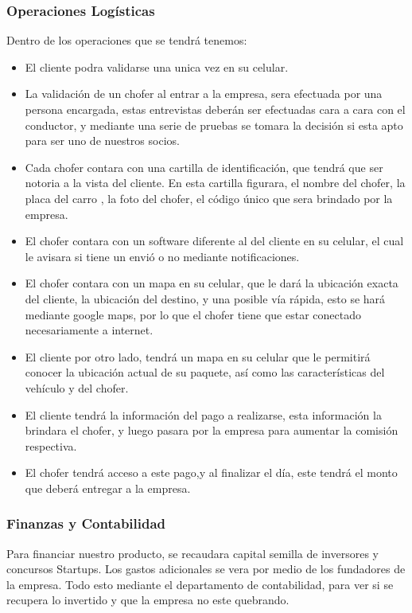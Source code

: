 \subsubsection{Operaciones Logísticas}
Dentro de los operaciones que se tendrá tenemos:
\begin{itemize}
    \item El cliente podra validarse una unica vez en su celular.
    \item La validación de un chofer al entrar a la empresa, sera efectuada por una persona encargada, estas entrevistas deberán ser efectuadas cara a cara con el conductor, y mediante una serie de pruebas se tomara la decisión si esta apto para ser uno de nuestros socios.
    \item Cada chofer contara con una cartilla de identificación, que tendrá que ser notoria a la vista del cliente. En esta cartilla figurara, el nombre del chofer, la placa del carro , la foto del chofer, el código único que sera brindado por la empresa.
    \item El chofer contara con un software diferente al del cliente en su celular, el cual le avisara si tiene un envió o no mediante notificaciones.
    \item El chofer contara con un mapa en su celular, que le dará la ubicación exacta del cliente, la ubicación del destino, y una posible vía rápida, esto se hará mediante google maps, por lo que el chofer tiene que estar conectado necesariamente a internet.
    \item El cliente por otro lado, tendrá un mapa en su celular que le permitirá conocer la ubicación actual de su paquete, así como las características del vehículo y del chofer.
    \item El cliente tendrá la información del pago a realizarse, esta información la brindara el chofer, y luego pasara por la empresa para aumentar la comisión respectiva. 
    \item El chofer tendrá acceso a este pago,y al finalizar el día, este tendrá el monto que deberá entregar a la empresa.
\end{itemize}

\subsubsection{Finanzas y Contabilidad}
Para financiar nuestro producto, se recaudara capital semilla de inversores y concursos Startups. Los gastos adicionales se vera por medio de los fundadores de la empresa. Todo esto mediante el departamento de contabilidad, para ver si se recupera lo invertido y que la empresa no este quebrando.

